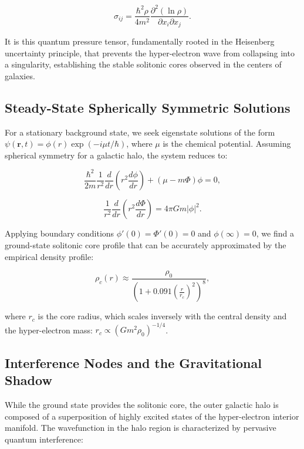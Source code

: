 \begin{equation}
\sigma_{ij} = \frac{\hbar^2 \rho}{4m^2} \frac{\partial^2 (\ln \rho)}{\partial x_i \partial x_j}.
\end{equation}

It is this quantum pressure tensor, fundamentally rooted in the Heisenberg uncertainty principle, that prevents the hyper-electron wave from collapsing into a singularity, establishing the stable solitonic cores observed in the centers of galaxies.

\subsection{Steady-State Spherically Symmetric Solutions}

For a stationary background state, we seek eigenstate solutions of the form $\psi(\mathbf{r},t) = \phi(r) \exp(-i \mu t / \hbar)$, where $\mu$ is the chemical potential. Assuming spherical symmetry for a galactic halo, the system reduces to:

\begin{equation}
\frac{\hbar^2}{2m} \frac{1}{r^2} \frac{d}{dr} \left( r^2 \frac{d\phi}{dr} \right) + (\mu - m\Phi)\phi = 0,
\end{equation}

\begin{equation}
\frac{1}{r^2} \frac{d}{dr} \left( r^2 \frac{d\Phi}{dr} \right) = 4\pi G m |\phi|^2.
\end{equation}

Applying boundary conditions $\phi'(0) = \Phi'(0) = 0$ and $\phi(\infty) = 0$, we find a ground-state solitonic core profile that can be accurately approximated by the empirical density profile:

\begin{equation}
\rho_c(r) \approx \frac{\rho_0}{\left(1 + 0.091 \left(\frac{r}{r_c}\right)^2 \right)^8},
\end{equation}

where $r_c$ is the core radius, which scales inversely with the central density and the hyper-electron mass: $r_c \propto (G m^2 \rho_0)^{-1/4}$.

\subsection{Interference Nodes and the Gravitational Shadow}

While the ground state provides the solitonic core, the outer galactic halo is composed of a superposition of highly excited states of the hyper-electron interior manifold. The wavefunction in the halo region is characterized by pervasive quantum interference:

